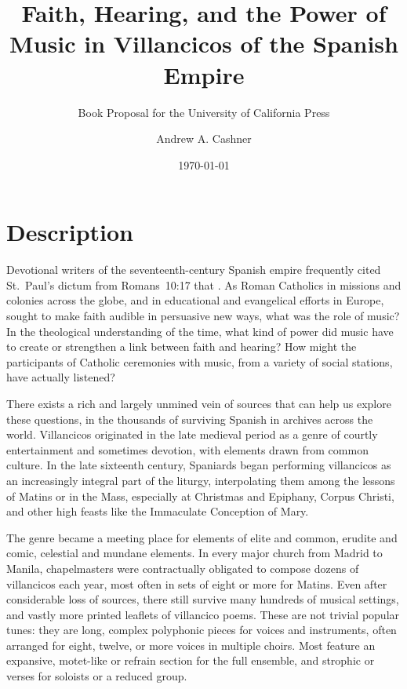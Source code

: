 \documentclass{vcbook-proposal}
\newcommand{\publisher}{the University of California Press}
\begin{document}
\frontmatter

\begin{titlingpage}
\title    {Faith, Hearing, and the Power of Music 
           in Villancicos of the Spanish Empire}
\subtitle {Book Proposal for \publisher}
\author   {Andrew A. Cashner}
\date     {\today}
\maketitle
\end{titlingpage}

\tableofcontents*

\mainmatter

\section{Description}

Devotional writers of the seventeenth-century Spanish empire frequently cited St.~Paul's dictum from Romans~10:17 that .
As Roman Catholics in missions and colonies across the globe, and in educational and evangelical efforts in Europe, sought to make faith audible in persuasive new ways, what was the role of music?
In the theological understanding of the time, what kind of power did music have to create or strengthen a link between faith and hearing?
How might the participants of Catholic ceremonies with music, from a variety of social stations, have actually listened?

There exists a rich and largely unmined vein of sources that can help us explore these questions, in the thousands of surviving Spanish  in archives across the world.
Villancicos originated in the late medieval period as a genre of courtly entertainment and sometimes devotion, with elements drawn from common culture.
In the late sixteenth century, Spaniards began performing villancicos as an increasingly integral part of the liturgy, interpolating them among the lessons of Matins or in the Mass, especially at Christmas and Epiphany, Corpus Christi, and other high feasts like the Immaculate Conception of Mary.

The genre became a meeting place for elements of elite and common, erudite and comic, celestial and mundane elements.
In every major church from Madrid to Manila, chapelmasters were contractually obligated to compose dozens of villancicos each year, most often in sets of eight or more for Matins.
Even after considerable loss of sources, there still survive many hundreds of musical settings, and vastly more printed leaflets of villancico poems. 
These are not trivial popular tunes: they are long, complex polyphonic pieces for voices and instruments, often arranged for eight, twelve, or more voices in multiple choirs.
Most feature an expansive, motet-like  or refrain section for the full ensemble, and strophic  or verses for soloists or a reduced group.
\end{document}
